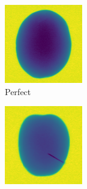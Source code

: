 \documentclass[11pt]{article}
\begin{document}
\begin{figure}[!h]
     \centering
     \begin{subfigure}[b]{0.25\textwidth}
         \centering
         \includegraphics[width=\textwidth]{figurer/data/perfect_22.jpg}
         \caption{Perfect}
         \label{fig:data_potato_perfect}
     \end{subfigure}
     \hfill
     \begin{subfigure}[b]{0.25\textwidth}
         \centering
         \includegraphics[width=\textwidth]{figurer/data/metal_44.jpg}

\end{subfigure}
\end{figure}
\end{document}
